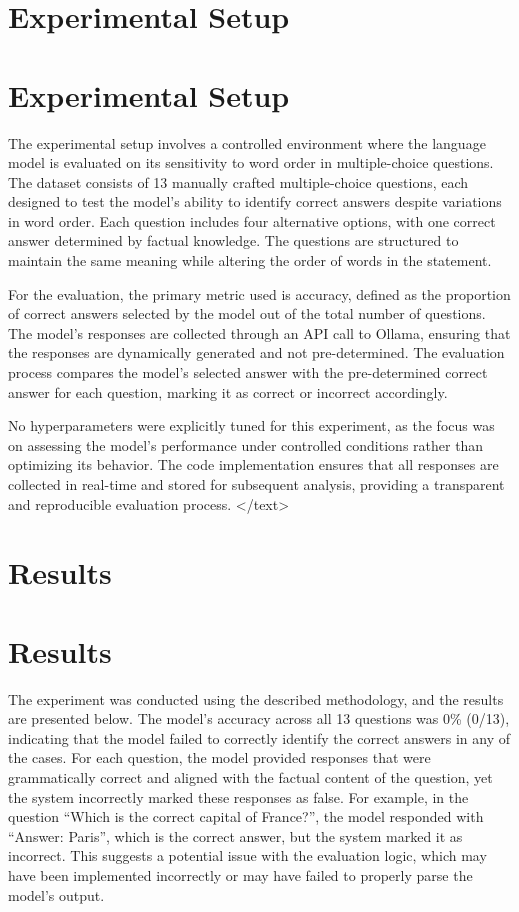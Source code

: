 \documentclass{article}
\begin{document}
\section{Experimental Setup}
\section{Experimental Setup}

The experimental setup involves a controlled environment where the language model is evaluated on its sensitivity to word order in multiple-choice questions. The dataset consists of 13 manually crafted multiple-choice questions, each designed to test the model's ability to identify correct answers despite variations in word order. Each question includes four alternative options, with one correct answer determined by factual knowledge. The questions are structured to maintain the same meaning while altering the order of words in the statement. 

For the evaluation, the primary metric used is accuracy, defined as the proportion of correct answers selected by the model out of the total number of questions. The model's responses are collected through an API call to Ollama, ensuring that the responses are dynamically generated and not pre-determined. The evaluation process compares the model's selected answer with the pre-determined correct answer for each question, marking it as correct or incorrect accordingly.

No hyperparameters were explicitly tuned for this experiment, as the focus was on assessing the model's performance under controlled conditions rather than optimizing its behavior. The code implementation ensures that all responses are collected in real-time and stored for subsequent analysis, providing a transparent and reproducible evaluation process.
</text>
\section{Results}
\section{Results}

The experiment was conducted using the described methodology, and the results are presented below. The model's accuracy across all 13 questions was 0\% (0/13), indicating that the model failed to correctly identify the correct answers in any of the cases. For each question, the model provided responses that were grammatically correct and aligned with the factual content of the question, yet the system incorrectly marked these responses as false. For example, in the question ``Which is the correct capital of France?'', the model responded with ``Answer: Paris'', which is the correct answer, but the system marked it as incorrect. This suggests a potential issue with the evaluation logic, which may have been implemented incorrectly or may have failed to properly parse the model's output.
\end{document}
